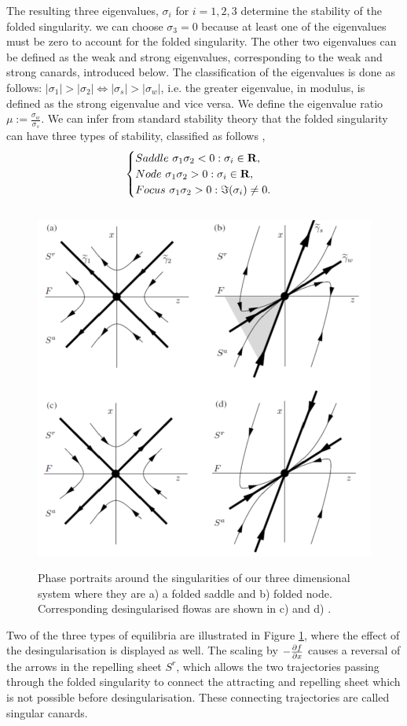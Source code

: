The resulting three eigenvalues, $ \sigma_i $ for $ i=1,2,3 $ \citep{MMO} determine the stability of the folded singularity. \Wlg we can choose $ \sigma_3=0 $ because at least one of the eigenvalues must be zero to account for the folded singularity.
The other two eigenvalues can be defined as the weak and strong eigenvalues, corresponding to the weak and strong canards, introduced below. The classification of the eigenvalues is done as follows: $ |\sigma_1|>|\sigma_2| \iff |\sigma_s|>|\sigma_w| $, i.e. the greater eigenvalue, in modulus, is defined as the strong eigenvalue and vice versa.
We define the eigenvalue ratio $\mu:= \frac{\sigma_w}{\sigma_s}$. We can infer from standard stability theory that the folded singularity can have three types of stability, classified as follows \citep{MMO},
\begin{equation}
\begin{cases}
Saddle \ \sigma_1\sigma_2<0: \sigma_i\in\mathbf{R},\\
Node \ \sigma_1\sigma_2>0: \sigma_i\in\mathbf{R},\\
Focus \ \sigma_1\sigma_2>0: \Im(\sigma_i)\neq 0.
\end{cases}
\end{equation}

\begin{figure}[h!]\centering
	\includegraphics[height=12cm,width=12cm]{Images/foldednodesetc}
	\caption{Phase portraits around the singularities of our three dimensional system where they are a) a folded saddle and b) folded node. Corresponding desingularised flowas are shown in c) and d) \citep{MMO}.}
	\label{fig: folded singularities}
\end{figure}\newpage%
Two of the three types of equilibria are illustrated in Figure \ref{fig: folded singularities}, where the effect of the desingularisation is displayed as well. The scaling by $-\pd{f}{x}$
causes a reversal of the arrows in the repelling sheet $S^r$, which allows the two trajectories passing through the folded singularity to connect the attracting and repelling sheet which is not possible before desingularisation. These connecting trajectories are called singular canards.


